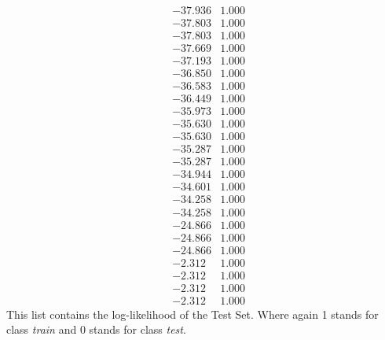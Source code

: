 \documentclass[conference]{IEEEtran}
\begin{document}
$$\begin{smallmatrix}
 &-37.936 &1.000\\
 &-37.803 &1.000\\
 &-37.803 &1.000\\
 &-37.669 &1.000\\
 &-37.193 &1.000\\
 &-36.850 &1.000\\
 &-36.583 &1.000\\
 &-36.449 &1.000\\
 &-35.973 &1.000\\
 &-35.630 &1.000\\
 &-35.630 &1.000\\
 &-35.287 &1.000\\
 &-35.287 &1.000\\
 &-34.944 &1.000\\
 &-34.601 &1.000\\
 &-34.258 &1.000\\
 &-34.258 &1.000\\
 &-24.866 &1.000\\
 &-24.866 &1.000\\
 &-24.866 &1.000\\
 &-2.312 &1.000\\
 &-2.312 &1.000\\
 &-2.312 &1.000\\
 &-2.312 &1.000
 \end{smallmatrix}
$$
\newpage
This list contains the log-likelihood of the Test Set. Where again 1 stands for class \textit{train} and 0 stands for class \textit{test}.
\end{document}

